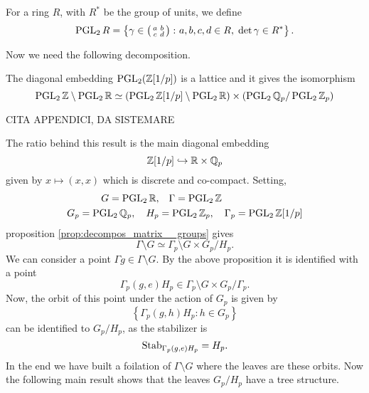 \begin{defin}
For a ring $R$, with $R^{\ast}$ be the group of units, we define 
\[
\operatorname{PGL}_{2} R=\left\{
\gamma\in\left(\begin{smallmatrix} a&b\\c&d \end{smallmatrix}\right)\colon a,b,c,d\in R,\;\det \gamma \in R^{\ast}
\right\}.
\]
\end{defin}
Now we need the following decomposition.

\begin{nprop}
\label{prop:decompos_matrix__groups}
The diagonal embedding $\operatorname{PGL}_{2}(\mathbb{Z}[1/p])$ is a lattice and it gives the isomorphism
\[
\operatorname{PGL}_{2}\mathbb{Z}\setminus\operatorname{PGL}_{2}\mathbb{R}\simeq\left(
\operatorname{PGL}_{2}\mathbb{Z}[1/p]\setminus\operatorname{PGL}_{2}\mathbb{R}
\right)\times\left(
\operatorname{PGL}_{2}\mathbb{Q}_{p}/\operatorname{PGL}_{2}\mathbb{Z}_{p}
\right)
\]
\end{nprop}
\begin{prf}
CITA APPENDICI, DA SISTEMARE
\end{prf}

The ratio behind this result is the main diagonal embedding 
\[
\mathbb{Z}[1/p]\hookrightarrow\mathbb{R}\times\mathbb{Q}_{p}
\]
given by $x\mapsto(x,x)$ which is discrete and co-compact. Setting,
\begin{align*}
G=\operatorname{PGL}_{2}\mathbb{R},&\quad\Gamma=\operatorname{PGL}_{2}\mathbb{Z}\\
G_{p}=\operatorname{PGL}_{2}\mathbb{Q}_{p},\quad H_{p}&=\operatorname{PGL}_{2}\mathbb{Z}_{p},\quad\Gamma_{p}=\operatorname{PGL}_{2}\mathbb{Z}[1/p]
\end{align*}
proposition \ref{prop:decompos_matrix__groups} gives
\[
\Gamma\setminus G\simeq \Gamma_{p}\setminus G\times G_{p}/H_{p}.
\]
We can consider a point $\Gamma g\in\Gamma\setminus G$. By the above proposition it is identified with a point
\[
\Gamma_{p}(g,e)H_{p}\in\Gamma_{p}\setminus G\times G_{p}/\Gamma_{p}.
\]
Now, the orbit of this point under the action of $G_{p}$ is given by
\[
\left\{
\Gamma_{p}(g,h)H_{p}\colon h\in G_{p}
\right\}
\]
can be identified to $G_{p}/H_{p}$, as the stabilizer is 
\[
\operatorname{Stab}_{\Gamma_{p}(g,e)H_{p}}=H_{p}.
\]
In the end we have built a foilation of $\Gamma\setminus G$ where the leaves are these orbits. Now the following main result shows that the leaves $G_{p}/H_{p}$ have a tree structure.

